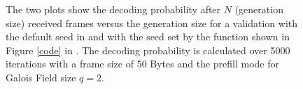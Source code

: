 \documentclass[a4paper,english,10pt]{tumarticle}
\begin{document}
\begin{figure}[htb]
  \centering
  \hfill
  \caption{The two plots show the decoding probability after $N$ (generation size) received frames versus the generation size for a validation with the default seed in \protect{} and with the seed set by the function shown in Figure \ref{code} in \protect{}. The decoding probability is calculated over 5000 iterations with a frame size of 50 Bytes and the prefill mode for Galois Field size $q=2$.}
  \label{fig:noseed}
\end{figure}
\end{document}
